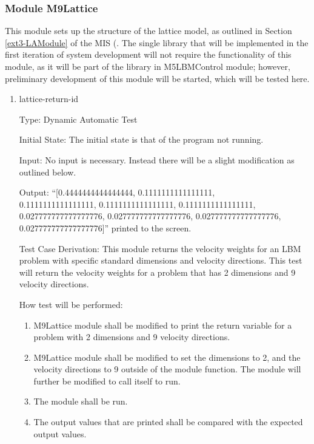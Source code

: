 \documentclass[12pt, titlepage]{article}
\newcounter{uvtestcounter} %
\begin{document}
\subsubsection{Module M9Lattice}
\label{M9lattice}

This module sets up the structure of the lattice model, as outlined in Section \ref{ext3-LAModule} of the MIS (\citet{LBM_MIS_PM}. The single library that will be implemented in the first iteration of system development will not require the functionality of this module, as it will be part of the library in M5LBMControl module; however, preliminary development of this module will be started, which will be tested here.

\begin{enumerate}
	
	\item{lattice-return-id\theuvtestcounter\\}
	
	Type: Dynamic Automatic Test

Initial State: The initial state is that of the program not running.

Input: No input is necessary. Instead there will be a slight modification as outlined below.
	
	Output: ``[0.4444444444444444, 0.1111111111111111, \\0.1111111111111111, 0.1111111111111111, 0.1111111111111111, \\0.027777777777777776, 0.027777777777777776, 0.027777777777777776, 0.027777777777777776]'' printed to the screen.
	
	Test Case Derivation: This module returns the velocity weights for an LBM problem with specific standard dimensions and velocity directions. This test will return the velocity weights for a problem that has 2 dimensions and 9 velocity directions.

How test will be performed: 
\begin{enumerate}
	\item M9Lattice module shall be modified to print the return variable for a problem with 2 dimensions and 9 velocity directions.
	\item M9Lattice module shall be modified to set the dimensions to 2, and the velocity directions to 9 outside of the module function. The module will further be modified to call itself to run.
	\item The module shall be run. 
	\item The output values that are printed shall be compared with the expected output values.
\end{enumerate}

\end{enumerate}
\end{document}
